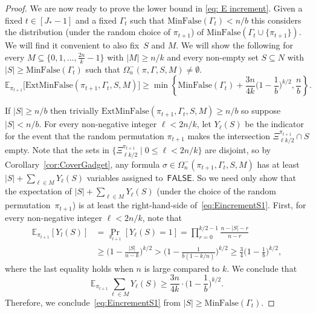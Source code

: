 \documentclass[11pt]{article}
\theoremstyle{definition}
\theoremstyle{remark}
\newcommand{\E}{\mathbb{E}}
\def\FALSE{\mathsf{FALSE}}
\def\notalltrue{\Omega_n^-}
\def\minfalse{\mathrm{MinFalse}}
\def\smallsetfalse{S}
\def\extminfalse{\mathrm{ExtMinFalse}}
\begin{document}
\begin{proof}
We are now ready to prove the lower bound in \eqref{eq: E increment}.
Given a fixed  $t\in [J_*-1]$ and a fixed $\Gamma_t$ such that $\minfalse(\Gamma_t) < n/b$
this considers the distribution (under the random choice of $\pi_{t+1}$) of $\minfalse(\Gamma_{t}\cup \{\pi_{t+1}\})$.  
We will find it convenient to also 
fix~$\smallsetfalse$ and $M$. We will show the following 
for every $M\subseteq \{0,1,\dots, \frac{2n}{k}-1\}$ with $|M|\ge n/k$
and every 
non-empty set  $\smallsetfalse \subseteq N$
with $|S| \geq \minfalse(\Gamma_t)$
such that $\notalltrue(\pi,\Gamma, \smallsetfalse, M) \neq \emptyset$.
\begin{equation}
\label{eq:EincrementS1}
\E_{\pi_{t+1}}\big[\extminfalse(\pi_{t+1},\Gamma_t,\smallsetfalse, M)  \big] \ge \min\left\{ \minfalse(\Gamma_t) + \frac{3n}{4k} \big(1-\frac{1}{b}\big)^{k/2}, \frac{n}{b} \right\}.    
\end{equation}

 
If $|\smallsetfalse|\geq n/b$ then trivially $\extminfalse(\pi_{t+1},\Gamma_t,\smallsetfalse,M) \geq n/b$ so suppose $|\smallsetfalse| < n/b$.
For every non-negative integer $\ell < 2n/k$, let $Y_\ell(\smallsetfalse)$ be 
the indicator for the event that the random permutation $\pi_{t+1}$ 
makes the intersection $\Xi_{\ell k/2}^{\pi_{t+1}} \cap \smallsetfalse$ empty.
Note that the sets 
in $\{ \Xi_{\ell k/2}^{\pi_{t+1}} \mid 0 \le \ell < 2n/k\}$ are disjoint, so by Corollary~\ref{cor:CoverGadget}, any
formula $\sigma \in \notalltrue(\pi_{t+1},\Gamma_t,\smallsetfalse, M)$   has at least
$|\smallsetfalse| + \sum_{\ell \in M} Y_\ell(\smallsetfalse)$ 
variables assigned to~$\FALSE$.
So we need only show that the expectation of 
$|\smallsetfalse| + \sum_{\ell \in M} Y_\ell(\smallsetfalse)$ (under the choice of the random permutation~$\pi_{t+1}$) is at least the right-hand-side of~\eqref{eq:EincrementS1}.
First, for every non-negative integer $\ell < 2n/k$,  note that
\begin{align*}
   \E_{\pi_{t+1}}[Y_l(S)]&=
\Pr_{\pi_{t+1}}[Y_\ell(\smallsetfalse)=1 
] = 
\prod_{r=0}^{k/2-1} \frac{n-|\smallsetfalse|-r}{n-r}\\
&\ge \big(1-\frac{|\smallsetfalse|}{n-k}\big)^{k/2} 
>  \big(1-\frac{1}{b(1-k/n)}\big)^{k/2}
\ge \frac{3}{4} \big(1-\frac{1}{b}\big)^{k/2},
\end{align*}
where the last equality holds when $n$ is large compared to $k$.
We conclude that \[\E_{\pi_{t+1}} \sum_{\ell \in M} Y_\ell(\smallsetfalse) \geq  \frac{3n}{4k}\cdot \big(1-\frac{1}{b}\big)^{k/2}.\]
Therefore, we conclude~\eqref{eq:EincrementS1}
from $|\smallsetfalse| \geq \minfalse(\Gamma_t)$. 
\end{proof}
\end{document}

